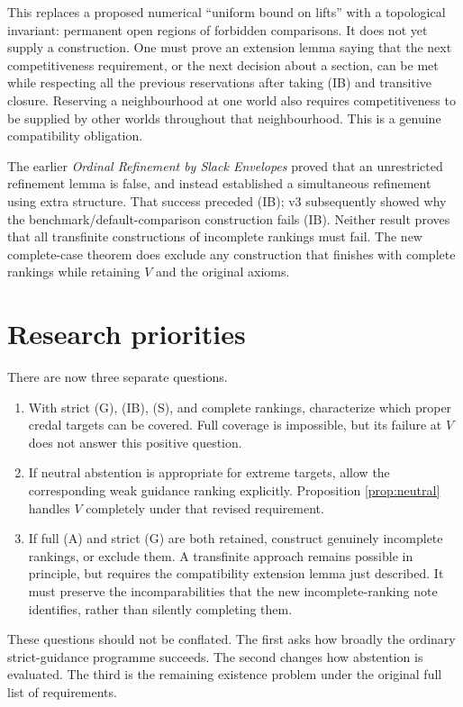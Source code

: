 \documentclass[11pt]{article}
\theoremstyle{remark}\newtheorem{remark}[proposition]{Remark}
\begin{document}
This replaces a proposed numerical ``uniform bound on lifts'' with a
topological invariant: permanent open regions of forbidden comparisons.
It does not yet supply a construction. One must prove an extension
lemma saying that the next competitiveness requirement, or the next
decision about a section, can be met while respecting all the previous
reservations after taking (IB) and transitive closure. Reserving a
neighbourhood at one world also requires competitiveness to be supplied
by other worlds throughout that neighbourhood. This is a genuine
compatibility obligation.

The earlier \emph{Ordinal Refinement by Slack Envelopes} proved that an
unrestricted refinement lemma is false, and instead established a
simultaneous refinement using extra structure. That success preceded
(IB); v3 subsequently showed why the benchmark/default-comparison
construction fails (IB). Neither result proves that all transfinite
constructions of incomplete rankings must fail. The new complete-case
theorem does exclude any construction that finishes with complete
rankings while retaining $V$ and the original axioms.

\section{Research priorities}

There are now three separate questions.
\begin{enumerate}[leftmargin=*]
\item With strict (G), (IB), (S), and complete rankings, characterize
which proper credal targets can be covered. Full coverage is impossible,
but its failure at $V$ does not answer this positive question.
\item If neutral abstention is appropriate for extreme targets, allow
the corresponding weak guidance ranking explicitly. Proposition
\ref{prop:neutral} handles $V$ completely under that revised requirement.
\item If full (A) and strict (G) are both retained, construct genuinely
incomplete rankings, or exclude them. A transfinite approach remains
possible in principle, but requires the compatibility extension lemma
just described. It must preserve the incomparabilities that the new
incomplete-ranking note identifies, rather than silently completing them.
\end{enumerate}
These questions should not be conflated. The first asks how broadly the
ordinary strict-guidance programme succeeds. The second changes how
abstention is evaluated. The third is the remaining existence problem
under the original full list of requirements.
\end{document}
